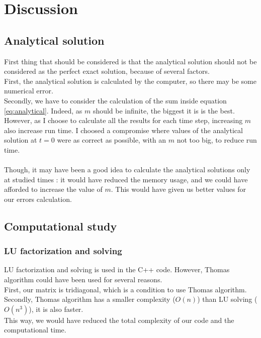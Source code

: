 \documentclass{article}
\begin{document}
        \section{Discussion}
            \subsection{Analytical solution}
                First thing that should be considered is that the analytical solution should not be
                considered as the perfect exact solution, because of several factors.
                \\
                First, the analytical solution is calculated by the computer, so there may be some numerical error.
                \\
                Secondly, we have to consider the calculation of the sum inside equation \eqref{eq:analytical}.
                Indeed, as $m$ should be infinite, the biggest it is is the best. However, as I choose to calculate
                all the results for each time step, increasing $m$ also increase run time. I choosed a compromise
                where values of the analytical solution at $t=0$ were as correct as possible, with an $m$ not too big,
                to reduce run time.
                \\
                \\
                Though, it may have been a good idea to calculate the analytical solutions only at studied times : 
                it would have reduced the memory usage, and we could have afforded to increase the value of $m$.
                This would have given us better values for our errors calculation.
    
            \subsection{Computational study}
                \subsubsection{LU factorization and solving}
                    LU factorization and solving is used in the C++ code. However, Thomas algorithm could have been used for several 
                    reasons.
                    \\
                    First, our matrix is tridiagonal, which is a condition to use Thomas algorithm.
                    \\
                    Secondly, Thomas algorithm has a smaller complexity ($O(n)$) than LU solving ($O(n^3)$), it is also faster.
                    \\
                    This way, we would have reduced the total complexity of our code and the computational time.
\end{document}
